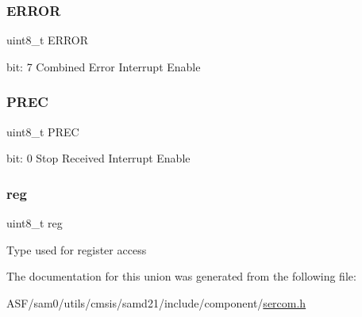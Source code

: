 \subsubsection{\texorpdfstring{ERROR}{ERROR}}
{\footnotesize\ttfamily uint8\+\_\+t E\+R\+R\+OR}

bit\+: 7 Combined Error Interrupt Enable \mbox{\label{union_s_e_r_c_o_m___i2_c_s___i_n_t_e_n_s_e_t___type_a0a58b5fb217cc2964590994ae435b2f4}} 
\subsubsection{\texorpdfstring{PREC}{PREC}}
{\footnotesize\ttfamily uint8\+\_\+t P\+R\+EC}

bit\+: 0 Stop Received Interrupt Enable \mbox{\label{union_s_e_r_c_o_m___i2_c_s___i_n_t_e_n_s_e_t___type_a9428adc9af4653a2050e2536b55dec8d}} 
\subsubsection{\texorpdfstring{reg}{reg}}
{\footnotesize\ttfamily uint8\+\_\+t reg}

Type used for register access 

The documentation for this union was generated from the following file\+:\begin{DoxyCompactItemize}
\item 
A\+S\+F/sam0/utils/cmsis/samd21/include/component/\mbox{\hyperlink{utils_2cmsis_2samd21_2include_2component_2sercom_8h}{sercom.\+h}}\end{DoxyCompactItemize}
